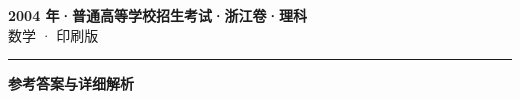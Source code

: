 \documentclass[zihao=5, a4paper]{ctexart}
\begin{document}
\begin{center}
  {\Large\bfseries 2004 年·普通高等学校招生考试·浙江卷·理科}\\[4pt]
  {\large 数学 · 印刷版}
\end{center}
\medskip
{}

\par\bigskip\hrule\bigskip
{}
\begin{center}{\large\bfseries 参考答案与详细解析}\end{center}
\smallskip

\end{document}
